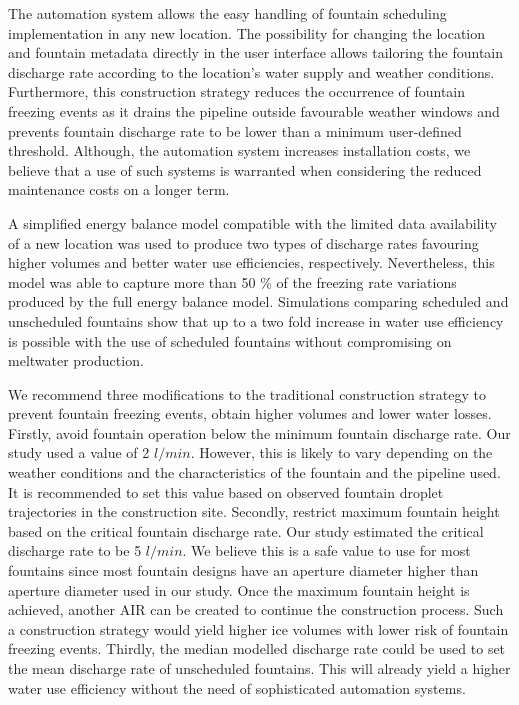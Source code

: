 \documentclass[tc, manuscript]{copernicus}
\begin{document}
The automation system allows the easy handling of fountain scheduling implementation in any new location. The
possibility for changing the location and fountain metadata directly in the user interface allows tailoring the
fountain discharge rate according to the location's water supply and weather conditions. Furthermore, this
construction strategy reduces the occurrence of fountain freezing events as it drains the pipeline outside
favourable weather windows and prevents fountain discharge rate to be lower than a minimum user-defined
threshold. Although, the automation system increases installation costs, we believe that a use of such systems
is warranted when considering the reduced maintenance costs on a longer term.

A simplified energy balance model compatible with the limited data availability of a new location was used to
produce two types of discharge rates favouring higher volumes and better water use efficiencies, respectively.
Nevertheless, this model was able to capture more than 50 \% of the freezing rate variations produced by the
full energy balance model. Simulations comparing scheduled and unscheduled fountains show that up to a two fold
increase in water use efficiency is possible with the use of scheduled fountains without compromising on
meltwater production.

We recommend three modifications to the traditional construction strategy to prevent fountain freezing events,
obtain higher volumes and lower water losses. Firstly, avoid fountain operation below the minimum fountain
discharge rate. Our study used a value of 2 $l/min$. However, this is likely to vary depending on the weather
conditions and the characteristics of the fountain and the pipeline used. It is recommended to set this value
based on observed fountain droplet trajectories in the construction site. Secondly, restrict maximum fountain
height based on the critical fountain discharge rate. Our study estimated the critical discharge rate to be 5
$l/min$. We believe this is a safe value to use for most fountains since most fountain designs have an aperture
diameter higher than aperture diameter used in our study. Once the maximum fountain height is achieved, another
AIR can be created to continue the construction process. Such a construction strategy would yield higher ice
volumes with lower risk of fountain freezing events. Thirdly, the median modelled discharge rate could be used
to set the mean discharge rate of unscheduled fountains. This will already yield a higher water use efficiency
without the need of sophisticated automation systems.
\end{document}
